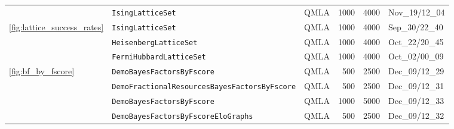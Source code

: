 \begin{tabular}{lllrrl}
                        & \texttt{IsingLatticeSet} &                                     QMLA &                                     1000 &                                     4000 &                           Nov\_19/12\_04 \\
\cline{1-6}
\multirow{3}{*}{\cref{fig:lattice_success_rates}} & \texttt{IsingLatticeSet} &                                     QMLA &                                     1000 &                                     4000 &                           Sep\_30/22\_40 \\
                        & \texttt{HeisenbergLatticeSet} &                                     QMLA &                                     1000 &                                     4000 &                           Oct\_22/20\_45 \\
                        & \texttt{FermiHubbardLatticeSet} &                                     QMLA &                                     1000 &                                     4000 &                           Oct\_02/00\_09 \\
\cline{1-6}
\multirow{4}{*}{\cref{fig:bf_by_fscore}} & \texttt{DemoBayesFactorsByFscore} &                                     QMLA &                                      500 &                                     2500 &                           Dec\_09/12\_29 \\
                        & \texttt{DemoFractionalResourcesBayesFactorsByFscore} &                                     QMLA &                                      500 &                                     2500 &                           Dec\_09/12\_31 \\
                        & \texttt{DemoBayesFactorsByFscore} &                                     QMLA &                                     1000 &                                     5000 &                           Dec\_09/12\_33 \\
                        & \texttt{DemoBayesFactorsByFscoreEloGraphs} &                                     QMLA &                                      500 &                                     2500 &                           Dec\_09/12\_32 \\
\hline
\end{tabular}
